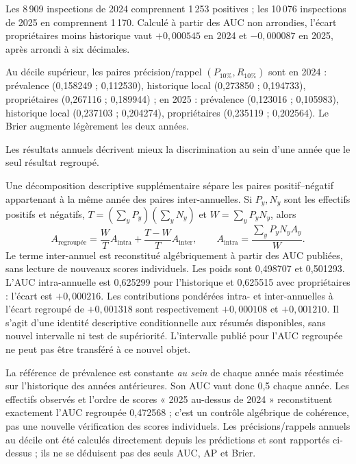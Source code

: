 Les 8\,909 inspections de 2024 comprennent 1\,253 positives ; les 10\,076 inspections de 2025 en comprennent 1\,170. Calculé à partir des AUC non arrondies, l'écart propriétaires moins historique vaut $+0,000545$ en 2024 et $-0,000087$ en 2025, après arrondi à six décimales.

Au décile supérieur, les paires précision/rappel $(P_{10\%},R_{10\%})$ sont en 2024 : prévalence (0,158249 ; 0,112530), historique local (0,273850 ; 0,194733), propriétaires (0,267116 ; 0,189944) ; en 2025 : prévalence (0,123016 ; 0,105983), historique local (0,237103 ; 0,204274), propriétaires (0,235119 ; 0,202564). Le Brier augmente légèrement les deux années.

Les résultats annuels décrivent mieux la discrimination au sein d'une année que le seul résultat regroupé.

Une décomposition descriptive supplémentaire sépare les paires positif--négatif appartenant à la même année des paires inter-annuelles. Si $P_y,N_y$ sont les effectifs positifs et négatifs, $T=(\sum_yP_y)(\sum_yN_y)$ et $W=\sum_yP_yN_y$, alors
\begin{equation}
 A_{\text{regroupée}}=\frac{W}{T} A_{\mathrm{intra}}+
 \frac{T-W}{T} A_{\mathrm{inter}},\qquad
 A_{\mathrm{intra}}=\frac{\sum_y P_yN_y A_y}{W}.
\label{eq:decomp}
\end{equation}
Le terme inter-annuel est reconstitué algébriquement à partir des AUC publiées, sans lecture de nouveaux scores individuels. Les poids sont 0,498707 et 0,501293. L'AUC intra-annuelle est 0,625299 pour l'historique et 0,625515 avec propriétaires : l'écart est $+0,000216$. Les contributions pondérées intra- et inter-annuelles à l'écart regroupé de $+0,001318$ sont respectivement $+0,000108$ et $+0,001210$. Il s'agit d'une identité descriptive conditionnelle aux résumés disponibles, sans nouvel intervalle ni test de supériorité. L'intervalle publié pour l'AUC regroupée ne peut pas être transféré à ce nouvel objet.

La référence de prévalence est constante \emph{au sein} de chaque année mais réestimée sur l'historique des années antérieures\cite{hgbcode}. Son AUC vaut donc 0,5 chaque année. Les effectifs observés et l'ordre de scores « 2025 au-dessus de 2024 » reconstituent exactement l'AUC regroupée 0,472568 ; c'est un contrôle algébrique de cohérence, pas une nouvelle vérification des scores individuels. Les précisions/rappels annuels au décile ont été calculés directement depuis les prédictions et sont rapportés ci-dessus ; ils ne se déduisent pas des seuls AUC, AP et Brier.

